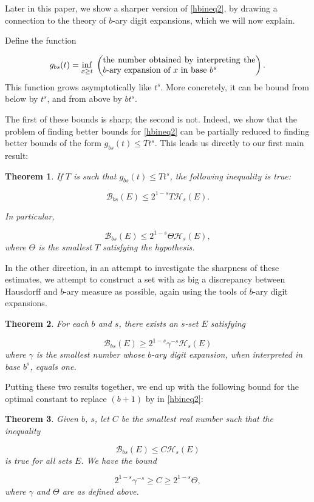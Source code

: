 \documentclass[11pt, reqno]{amsart}
\newcommand{\HH}{\mathcal{H}}
\newcommand{\BB}{\mathcal{B}}
\newtheorem{theorem}{Theorem}
\begin{document}
Later in this paper, we show a sharper version of \eqref{hbineq2}, by drawing a connection to the theory of $b$-ary digit expansions, which we will now explain. 

Define the function

\[ g_{bs} (t) = \inf_{x \geq t}\;\left(\parbox{18em}{the number obtained by interpreting the $b$-ary expansion of $x$ in base $b^s$}\right).\]
This function grows asymptotically like $t^s$. More concretely, it can be bound from below by $t^s$, and from above by $b t^s$.

The first of these bounds is sharp; the second is not. Indeed, we show that the problem of finding better bounds for \eqref{hbineq2} can be partially reduced to finding better bounds of the form $g_{bs}(t) \leq T t^s$. This leads us directly to our first main result:

\begin{theorem}
If $T$ is such that $g_{bs}(t) \leq T t^s$, the following inequality is true:

\[\BB_{bs}(E) \leq 2^{1-s} T \HH_s(E).\]

In particular,

\[\BB_{bs}(E) \leq 2^{1-s} \Theta \HH_s(E),\]
where $\Theta$ is the smallest $T$ satisfying the hypothesis.
\end{theorem}

In the other direction, in an attempt to investigate the sharpness of these estimates, we attempt to construct a set with as big a discrepancy between Hausdorff and $b$-ary measure as possible, again using the tools of $b$-ary digit expansions.

\begin{theorem}\label{clowerbound}
For each $b$ and $s$, there exists an $s$-set $E$ satisfying

\[\BB_{bs}(E) \geq 2^{1-s} \gamma^{-s} \HH_s(E)\]
where $\gamma$ is the smallest number whose $b$-ary digit expansion, when interpreted in base $b^s$, equals one.
\end{theorem}

Putting these two results together, we end up with the following bound for the optimal constant to replace $(b+1)$ by in \eqref{hbineq2}:

\begin{theorem}\label{cbounds}
Given $b$, $s$, let $C$ be the smallest real number such that the inequality

\[\BB_{bs}(E) \leq C \HH_s(E)\]
is true for all sets $E$. We have the bound

\[2^{1-s} \gamma^{-s} \geq C \geq 2^{1-s} \Theta,\]
where $\gamma$ and $\Theta$ are as defined above.
\end{theorem}
\end{document}
